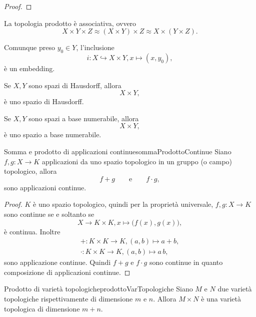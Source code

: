 \begin{proof}
\end{proof}

\begin{pr}\label{pr:prod1}
	La topologia prodotto è associativa, ovvero
	\[
		X \times Y \times Z \approx (X\times Y) \times Z \approx X\times (Y\times Z).
	\]
\end{pr}

\begin{pr}\label{pr:prod2}
	Comunque preso \(y_0\in Y\), l'inclusione
	\[
		i\colon X \hookrightarrow X\times Y, x\mapsto(x,y_0),
	\]
	è un embedding.
\end{pr}

\begin{pr}\label{pr:prod3}
	Se \(X,Y\) sono spazi di Hausdorff, allora
	\[
		X\times Y,
	\]
	è uno spazio di Hausdorff.
\end{pr}

\begin{pr}\label{pr:prod4}
	Se \(X,Y\) sono spazi a base numerabile, allora
	\[
		X\times Y,
	\]
	è uno spazio a base numerabile.
\end{pr}

\begin{prop}{Somma e prodotto di applicazioni continue}{sommaProdottoContinue}
	Siano \(f,g\colon X\to K\) applicazioni da uno spazio topologico in un gruppo (o campo) topologico, allora
	\[
		f+g \qquad\text{e}\qquad f\cdot g,
	\]
	sono applicazioni continue.
\end{prop}

\begin{proof}
	\(K\) è uno spazio topologico, quindi per la proprietà universale, \(f,g\colon X\to K\) sono continue se e soltanto se
	\[
		X \to K\times K, x\mapsto \big( f(x),g(x) \big),
	\]
	è continua.
	Inoltre
	\begin{gather*}
		+\colon K \times K \to K, (a,b) \mapsto a+b,\\
		\cdot \colon K\times K \to K, (a,b) \mapsto a\,b,
	\end{gather*}
	sono applicazione continue.
	Quindi \(f+g\) e \(f\cdot g\) sono continue in quanto composizione di applicazioni continue.
\end{proof}

\begin{prop}{Prodotto di varietà topologiche}{prodottoVarTopologiche}
	Siano \(M\) e \(N\) due varietà topologiche rispettivamente di dimensione \(m\) e \(n\).
	Allora \(M\times N\) è una varietà topologica di dimensione \(m+n\).
\end{prop}

